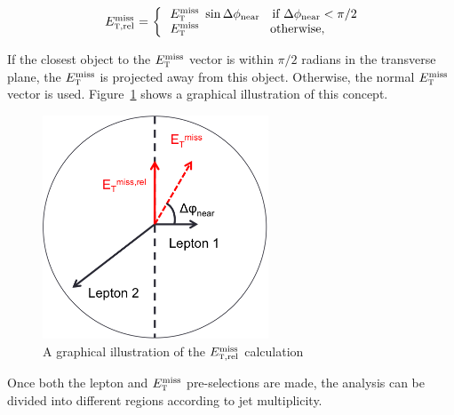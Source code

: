 \begin{equation}
  \begin{array}{ll}
  \multirow{2}{*}{$\METrel$ =\ \bigg\{ }
    &\!\!\!\!\MET\ \sin\dphiNear\quad\textrm{if $\dphiNear<\pi/2$}\\
    &\!\!\!\!\MET\ \phantom{\sin\dphiNear}\quad\textrm{otherwise,}
  \end{array}
\label{eqn:METrel}
\end{equation}

If the closest object to the $E_{\textrm{\footnotesize\sc t}}^{\rm miss}$ vector is within $\pi/2$ radians in the transverse plane, the $E_{\textrm{\footnotesize\sc t}}^{\rm miss}$ is projected away from this object. Otherwise, the normal $E_{\textrm{\footnotesize\sc t}}^{\rm miss}$ vector is used. Figure~\ref{fig:METrel} shows a graphical illustration of this concept. 

\begin{figure}[h!]
  \centering
  \captionsetup{justification=centering}

  \includegraphics[width=0.6\textwidth]{figures/METrel_cartoon}
  \caption{A graphical illustration of the $E_{{\textrm{\footnotesize\sc t}},{\rm rel}}^{\rm miss}$ calculation}
  \label{fig:METrel}
\end{figure}

Once both the lepton and $E_{\textrm{\footnotesize\sc t}}^{\rm miss}$ pre-selections are made, the analysis can be divided into different regions according to jet multiplicity.

